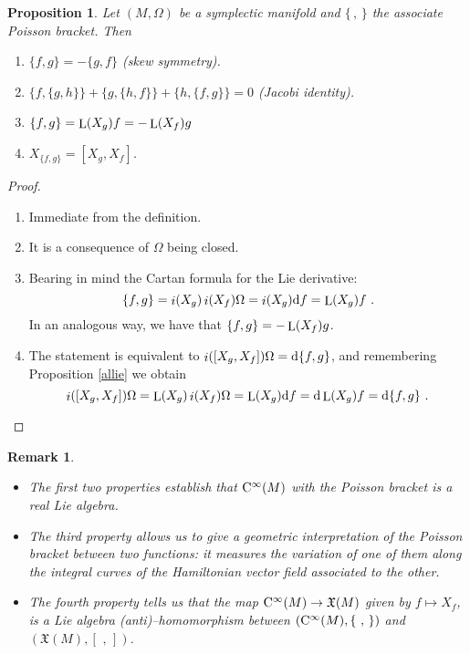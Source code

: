 \documentclass[12pt]{report}
\newtheorem{prop}[teor]{Proposition}
\newtheorem{remark}[teor]{Remark}
\def\beq{\begin{equation}}
\def\eeq{\end{equation}}
\def\qed{\ifvmode\removelastskip\fi
{\unskip\nobreak\hfil\penalty50\hbox{}\nobreak\hfil
\hbox{\vrule height1.2ex width1.2ex}\parfillskip=0pt
\finalhyphendemerits=0 \par\smallskip}}
\def\vf{\mathfrak X}
\def\d{{\rm d}}
\def\Lie{\mathop{\rm L}\nolimits}
\def\inn{\mathop{i}\nolimits}
\def\Cinfty{{\rm C}^\infty}
\begin{document}
\begin{prop}
Let $(M,\Omega )$ be a symplectic manifold and $\{\,,\,\}$ the associate Poisson bracket. Then
\vspace{-3mm}
\begin{enumerate}
\item
$\{ f,g \}=-\{ g,f \}$ ({\sl skew symmetry}).
\item
$\{ f,\{ g,h \}\} + \{ g,\{ h,f \}\} + \{ h,\{ f,g \}\} = 0$ ({\sl Jacobi identity}).
\item
$\{ f,g \}=\Lie (X_g)f =-\Lie (X_f)g$
\item
$X_{\{ f,g \}} = [X_g,X_f]$.
\end{enumerate}
\end{prop}
\begin{proof}
\begin{enumerate}
\item
Immediate from the definition.
\item
It is a consequence of $\Omega$ being closed.
\item
Bearing in mind the Cartan formula for the Lie derivative:
$$
\{ f,g \} = \inn(X_g)\inn(X_f)\Omega = \inn(X_g)\d f = \Lie (X_g)f \ .
$$
In an analogous way, we have that
$\{ f,g \} = -\Lie (X_f)g$.
\item
The statement is equivalent to $\inn([X_g,X_f])\Omega = \d \{ f,g \}$,
and remembering Proposition \ref{allie} we obtain
\beq
\inn([X_g,X_f])\Omega =\Lie (X_g)\inn(X_f)\Omega = \Lie(X_g)\d f=
\d\Lie(X_g)f=\d \{ f,g \} \ .
\label{expre}
\eeq
\end{enumerate}
\qed  \end{proof}

\begin{remark}{\rm 
\begin{itemize}
\item
The first two properties establish that
$\Cinfty (M)$  with the Poisson bracket is a real Lie algebra.
\item
The third property allows us to give a geometric interpretation
of the Poisson bracket between two functions: it measures the variation of one of them along
the integral curves of the Hamiltonian vector field associated to the other.
\item
The fourth property tells us that the map  $\Cinfty (M)\to\vf(M)$ given by $f\mapsto X_{f}$, is a Lie algebra
(anti)--homomorphism between $(\Cinfty (M),\{\,\, ,\,\})$ and $(\vf (M),[\, \, ,\,])$.
\end{itemize}
}\end{remark}
\end{document}
